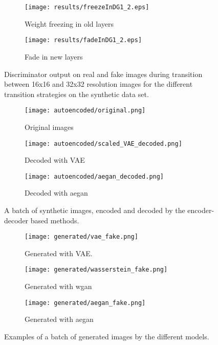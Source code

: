 \begin{figure}[t]
    \centering
    \begin{subfigure}[b]{0.49\textwidth}
        \texttt{[image: results/freezeInDG1\_2.eps]}
        \caption{Weight freezing in old layers}
        \label{fig:freezeInDG1}
    \end{subfigure}
    \begin{subfigure}[b]{0.49\textwidth}
        \texttt{[image: results/fadeInDG1\_2.eps]}
        \caption{Fade in new layers}
        \label{fig:freezeInDG2}
    \end{subfigure}
    \caption{Discriminator output on real and fake images during transition between 16x16 and 32x32 resolution images for the different transition strategies on the synthetic data set.}
    \label{fig:fadeVsFreeze}
\end{figure}

\begin{figure}[t]
    \centering
    \begin{subfigure}[b]{\textwidth}
        \texttt{[image: autoencoded/original.png]}
        \caption{Original images}
        \label{fig:stuff}
    \end{subfigure}
    \begin{subfigure}[b]{\textwidth}
        \texttt{[image: autoencoded/scaled\_VAE\_decoded.png]}
        \caption{Decoded with VAE}
        \label{fig:stuff}
    \end{subfigure}
    \begin{subfigure}[b]{\textwidth}
        \texttt{[image: autoencoded/aegan\_decoded.png]}
        \caption{Decoded with \acrshort{aegan}}
        \label{fig:stuff}
    \end{subfigure}
    \caption{A batch of synthetic images, encoded and decoded by the encoder-decoder based methods.}
    \label{fig:autoencoders}
\end{figure}

\begin{figure}[t]
    \centering
    \begin{subfigure}[b]{\textwidth}
        \texttt{[image: generated/vae\_fake.png]}
        \caption{Generated with VAE.}
        \label{fig:stuff}
    \end{subfigure}
    \begin{subfigure}[b]{\textwidth}
        \texttt{[image: generated/wasserstein\_fake.png]}
        \caption{Generated with \acrshort{wgan}}
        \label{fig:stuff}
    \end{subfigure}
    \begin{subfigure}[b]{\textwidth}
        \texttt{[image: generated/aegan\_fake.png]}
        \caption{Generated with \acrshort{aegan}}
        \label{fig:stuff}
    \end{subfigure}
    \caption{Examples of a batch of generated images by the different models.}
    \label{fig:gans}
\end{figure}

